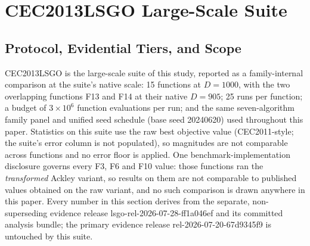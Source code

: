 \documentclass[algorithms,article,submit,moreauthors,pdftex]{Definitions/mdpi}
\begin{document}
\section{CEC2013LSGO Large-Scale Suite}\label{sec:supp:cec2013lsgo}

\subsection{Protocol, Evidential Tiers, and Scope}\label{sec:supp:lsgo:protocol}

\noindent CEC2013LSGO is the large-scale suite of this study, reported as a
family-internal comparison at the suite's native scale: 15 functions at
$D = 1000$, with the two overlapping functions F13 and F14 at their native
$D = 905$; 25 runs per function; a budget of $3 \times 10^{6}$ function
evaluations per run; and the same seven-algorithm family panel and unified
seed schedule (base seed 20240620) used throughout this
paper.  Statistics on this suite use the raw best
objective value (CEC2011-style; the suite's error column is not populated),
so magnitudes are not comparable across functions and no error floor is
applied.  One benchmark-implementation disclosure governs every F3, F6 and
F10 value: those functions ran the \emph{transformed} Ackley variant, so
results on them are not comparable to published values obtained on the raw
variant, and no such comparison is drawn anywhere in this paper.
Every number in this section derives from the separate, non-superseding
evidence release lsgo-rel-2026-07-28-ff1a046ef and its committed analysis
bundle; the primary evidence release rel-2026-07-20-67d9345f9 is untouched
by this suite.
\end{document}

